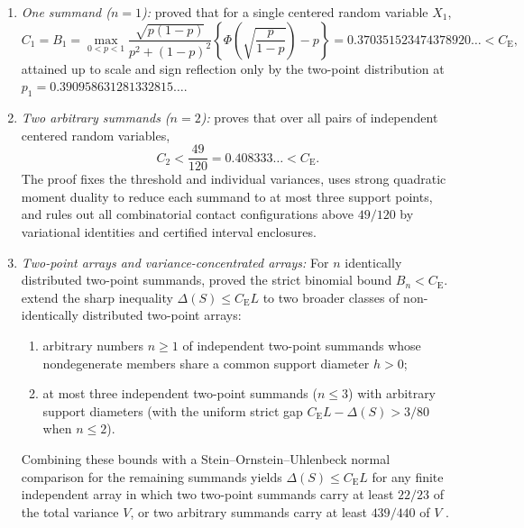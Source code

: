 \documentclass[11pt]{article}
\numberwithin{equation}{section}
\theoremstyle{definition}
\theoremstyle{remark}
\newcommand{\ce}{C_{\mathrm E}}
\begin{document}
\begin{enumerate}[label=(\arabic*),leftmargin=2em]
\item \emph{One summand ($n=1$):} \citet[Theorem~1]{BentkusKirsa1989} proved
that for a single centered random variable $X_1$,
\begin{equation}\label{eq:c1-bound}
 C_1=B_1=\max_{0<p<1}\frac{\sqrt{p(1-p)}}{p^2+(1-p)^2}
 \left\{\Phi\!\left(\sqrt{\frac{p}{1-p}}\right)-p\right\}
 =0.370351523474378920\ldots<\ce,
\end{equation}
attained up to scale and sign reflection only by the two-point distribution at
$p_1=0.390958631281332815\ldots$.

\item \emph{Two arbitrary summands ($n=2$):} \citet[Theorem~1.1]{BellFinite2026}
proves that over all pairs of independent centered random variables,
\begin{equation}\label{eq:c2-bound}
 C_2<\frac{49}{120}=0.408333\ldots<\ce.
\end{equation}
The proof fixes the threshold and individual variances, uses strong quadratic
moment duality \citep{Winkler1988,BertsimasPopescu2005} to reduce each summand
to at most three support points, and rules out all combinatorial contact
configurations above $49/120$ by variational identities and certified interval
enclosures.

\item \emph{Two-point arrays and variance-concentrated arrays:} For $n$
identically distributed two-point summands, \citet[Theorem~1]{Schulz2016}
proved the strict binomial bound $B_n<\ce$. \citet[Theorems~1.2 and~1.3]{BellFinite2026}
extend the sharp inequality $\Delta(S)\le\ce L$ to two broader classes of
non-identically distributed two-point arrays:
\begin{enumerate}[label=(\alph*),leftmargin=2em]
\item arbitrary numbers $n\ge1$ of independent two-point summands whose
nondegenerate members share a common support diameter $h>0$;
\item at most three independent two-point summands ($n\le3$) with arbitrary
support diameters (with the uniform strict gap $\ce L-\Delta(S)>3/80$ when
$n\le2$).
\end{enumerate}
Combining these bounds with a Stein--Ornstein--Uhlenbeck normal comparison for
the remaining summands yields $\Delta(S)\le\ce L$ for any finite independent
array in which two two-point summands carry at least $22/23$ of the total
variance $V$, or two arbitrary summands carry at least $439/440$ of $V$
\citep[Corollary~1.4]{BellFinite2026}.


\end{enumerate}
\end{document}
